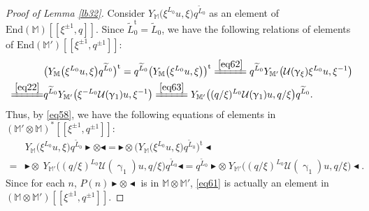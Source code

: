 \documentclass[12pt,a4paper,notitlepage]{article}
\theoremstyle{definition}
\theoremstyle{plain}
\newcommand{\mc}{\mathcal}
\newcommand{\wtd}{\widetilde}
\newcommand{\tr}{\mathrm{t}} %
\newcommand{\End}{\mathrm{End}} %
\newcommand{\Mbb}{\mathbb M}
\newcommand{\btl}{\blacktriangleleft}
\newcommand{\btr}{\blacktriangleright}
\numberwithin{equation}{section}
\begin{document}
\begin{proof}[Proof of Lemma \ref{lb32}]
	Consider $Y_{\Mbb}\big(\xi^{L_0}u,\xi\big)q^{\wtd L_0}$ as an element of $\End(\Mbb)[[\xi^{\pm1},q]]$. Since $\wtd L_0^\tr=\wtd L_0$,  we have the following relations of elements of $\End(\Mbb')[[\xi^{\pm1},q^{\pm 1}]]$:
	\begin{align*}
	&\big(Y_{\Mbb}\big(\xi^{L_0}u,\xi\big)q^{\wtd L_0}\big)^\tr=q^{\wtd L_0}\big(Y_{\Mbb}\big(\xi^{L_0}u,\xi\big)\big)^\tr\xlongequal{\eqref{eq62}}q^{\wtd L_0}Y_{\Mbb'}\big(\mc U(\upgamma_\xi)\xi^{L_0}u,\xi^{-1}\big)\\
	\xlongequal{\eqref{eq22}}&q^{\wtd L_0}Y_{\Mbb'}\big(\xi^{-L_0}\mc U(\upgamma_1)u,\xi^{-1}\big)\xlongequal{\eqref{eq63}}Y_{\Mbb'}\big((q/\xi)^{L_0}\mc U(\upgamma_1)u,q/\xi\big)q^{\wtd L_0}.
	\end{align*}
Thus, by \eqref{eq58}, we have the following equations of elements in $(\Mbb'\otimes\Mbb)^*[[\xi^{\pm1},q^{\pm 1}]]$:
	\begin{align}
	&Y_{\Mbb}\big(\xi^{L_0}u,\xi\big)q^{\wtd L_0}\btr\otimes\btl=\btr\otimes \big(Y_{\Mbb}\big(\xi^{L_0}u,\xi\big)q^{\wtd L_0}\big)^\tr\btl\nonumber\\
	=&\btr\otimes~Y_{\Mbb'}\big((q/\xi)^{L_0}\mc U(\upgamma_1)u,q/\xi\big)q^{\wtd L_0}\btl=q^{\wtd L_0}\btr\otimes~Y_{\Mbb'}\big((q/\xi)^{L_0}\mc U(\upgamma_1)u,q/\xi\big)\btl.\label{eq61}
	\end{align}
	Since for each $n$, $P(n)\btr\otimes\btl$ is in $\Mbb\otimes\Mbb'$, \eqref{eq61} is actually an element in $(\Mbb\otimes\Mbb')[[\xi^{\pm1},q^{\pm 1}]]$.
	

\end{proof}
\end{document}
